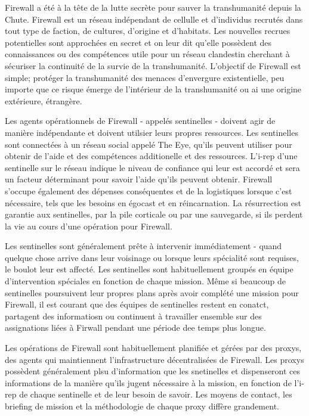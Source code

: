                                              Firewall a été à la tête de la lutte secrète pour sauver la transhumanité depuis la Chute. Firewall est un réseau indépendant de cellulle et d'individus recrutés dans tout type de faction, de cultures, d'origine et d'habitats. Les nouvelles recrues potentielles sont approchées en secret et on leur dit qu'elle possèdent des connaissances ou des compétences utile pour un réseau clandestin cherchant à sécuriser la continuité de la survie de la transhumanité. L'objectif de Firewall est simple; protéger la transhumanité des menaces d'envergure existentielle, peu importe que ce risque émerge de l'intérieur de la transhumanité ou ai une origine extérieure, étrangère. 

                                             Les agents opérationnels de Firewall - appelés sentinelles - doivent agir de manière indépendante et doivent utilsier leurs propres ressources. Les sentinelles sont connectées à un réseau social appelé The Eye, qu'ils peuvent utiliser pour obtenir de l'aide et des compétences additionelle et des ressources. L'i-rep d'une sentinelle sur le réseau indique le niveau de confiance qui leur est accordé et sera un facteur déterminant pour savoir l'aide qu'ils peuvent obtenir. Firewall s'occupe également des dépenses conséquentes et de la logistiques lorsque c'est nécessaire, tels que les besoins en égocast et en réincarnation. La résurrection est garantie aux sentinelles, par la pile corticale ou par une sauvegarde, si ils perdent la vie au cours d'une opération pour Firewall. 

                                             Les sentinelles sont généralement prête à intervenir immédiatement - quand quelque chose arrive dans leur voisinage ou lorsque leurs spécialité sont requises, le boulot leur est affecté. Les sentinelles sont habituellement groupés en équipe d'intervention spéciales en fonction de chaque mission. Même si beaucoup de sentinelles poursuivent leur propres plans après avoir complété une mission pour Firewall, il est courant que des équipes de sentinelles restent en conatct, partagent des informatiosn ou continuent à travailler ensemble sur des assignations liées à Firwall pendant une période dee temps plus longue. 

                                             Les opérations de Firewall sont habituellement planifiée et gérées par des proxys, des agents qui maintiennent l'infrastructure décentralisées de Firewall. Les proxys possèdent généralement plsu d'information que les snetinelles et dispenseront ces informations de la manière qu'ils jugent nécessaire à la mission, en fonction de l'i-rep de chaque sentinelle et de leur besoin de savoir. Les moyens de contact, les briefing de mission et la méthodologie de chaque proxy diffère grandement. 

